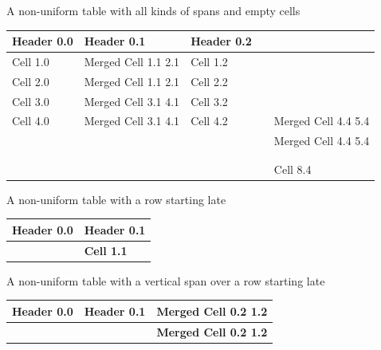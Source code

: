 \documentclass[11pt,a4paper]{article}
\begin{document}
A non-uniform table with all kinds of spans and empty cells

\begin{table}[h]
\begin{tabular}{|l|l|l|l|l|}
\hline
\textbf{Header 0.0} & \textbf{Header 0.1} & \textbf{Header 0.2} &  &  \\ \hline
Cell 1.0 & Merged Cell 1.1 2.1 & Cell 1.2 &  &  \\ \hline
Cell 2.0 & Merged Cell 1.1 2.1 & Cell 2.2 &  &  \\ \hline
Cell 3.0 & Merged Cell 3.1 4.1 & Cell 3.2 &  &  \\ \hline
Cell 4.0 & Merged Cell 3.1 4.1 & Cell 4.2 &  & Merged Cell 4.4 5.4 \\ \hline
 &  &  &  & Merged Cell 4.4 5.4 \\ \hline
 &  &  &  &  \\ \hline
 &  &  &  &  \\ \hline
 &  &  &  & Cell 8.4 \\ \hline
\end{tabular}
\end{table}

A non-uniform table with a row starting late

\begin{table}[h]
\begin{tabular}{|l|l|}
\hline
\textbf{Header 0.0} & \textbf{Header 0.1} \\ \hline
 & \textbf{Cell 1.1} \\ \hline
\end{tabular}
\end{table}

A non-uniform table with a vertical span over a row starting late

\begin{table}[h]
\begin{tabular}{|l|l|l|}
\hline
\textbf{Header 0.0} & \textbf{Header 0.1} & \textbf{Merged Cell 0.2 1.2} \\ \hline
 &  & \textbf{Merged Cell 0.2 1.2} \\ \hline
\end{tabular}
\end{table}
\end{document}
